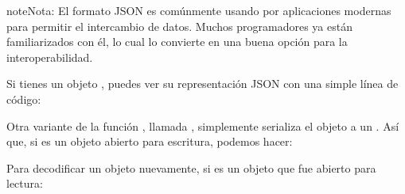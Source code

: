 \documentclass[a4,10pt,spanish]{sphinxmanual}
\begin{document}
\begin{sphinxadmonition}{note}{Nota:}
\sphinxAtStartPar
El formato JSON es comúnmente usando por aplicaciones modernas para permitir el intercambio de datos. Muchos programadores ya están familiarizados con él, lo cual lo convierte en una buena opción para la interoperabilidad.
\end{sphinxadmonition}

\sphinxAtStartPar
Si tienes un objeto , puedes ver su representación JSON con una simple línea de código:

\begin{sphinxVerbatim}[commandchars=\\\{\}]
 
  \PYG{p}{[}  \PYG{p}{]}
\end{sphinxVerbatim}

\sphinxAtStartPar
Otra variante de la función , llamada , simplemente serializa el objeto a un {\hyperref[\detokenize{glossary:term-text-file}]{}}. Así que, si  es un objeto {\hyperref[\detokenize{glossary:term-text-file}]{}} abierto para escritura, podemos hacer:

\begin{sphinxVerbatim}[commandchars=\\\{\}]
 
\end{sphinxVerbatim}

\sphinxAtStartPar
Para decodificar un objeto nuevamente, si  es un objeto {\hyperref[\detokenize{glossary:term-text-file}]{}} que fue abierto para lectura:

\begin{sphinxVerbatim}[commandchars=\\\{\}]
  
\end{sphinxVerbatim}
\end{document}
